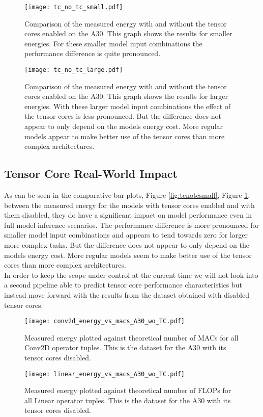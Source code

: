 \documentclass[conference]{IEEEtran}
\begin{document}
\begin{figure}
    \texttt{[image: tc\_no\_tc\_small.pdf]}
    \caption{Comparison of the measured energy with and without the tensor cores enabled on the A30. This graph shows the results for smaller energies. For these smaller model input combinations the performance difference is quite pronounced.}
    \label{fig:tcnotcsmall}
    \texttt{[image: tc\_no\_tc\_large.pdf]}
    \caption{Comparison of the measured energy with and without the tensor cores enabled on the A30. This graph shows the results for larger energies. With these larger model input combinations the effect of the tensor cores is less pronounced. But the difference does not appear to only depend on the models energy cost. More regular models appear to make better use of the tensor cores than more complex architectures.}
    \label{fig:tcnotclarge}
\end{figure}


\subsection{Tensor Core Real-World Impact}
As can be seen in the comparative bar plots, Figure \ref{fig:tcnotcsmall}, Figure \ref{fig:tcnotclarge}, between the measured energy for the models with tensor cores enabled and with them disabled, they do have a significant impact on model performance even in full model inference scenarios. The performance difference is more pronounced for smaller model input combinations and appears to tend towards zero for larger more complex tasks. But the difference does not appear to only depend on the models energy cost. More regular models seem to make better use of the tensor cores than more complex architectures. \\
In order to keep the scope under control at the current time we will not look into a second pipeline able to predict tensor core performance characteristics but instead move forward with the results from the dataset obtained with disabled tensor cores.

\begin{figure}
    \texttt{[image: conv2d\_energy\_vs\_macs\_A30\_wo\_TC.pdf]}
    \caption{Measured energy plotted against theoretical number of MACs for all Conv2D operator tuples. This is the dataset for the A30 with its tensor cores disabled.}
    \label{fig:conv2da30notc}
    \texttt{[image: linear\_energy\_vs\_macs\_A30\_wo\_TC.pdf]}
    \caption{Measured energy plotted against theoretical number of FLOPs for all Linear operator tuples. This is the dataset for the A30 with its tensor cores disabled.}
    \label{fig:lina30notc}
\end{figure}
\end{document}
